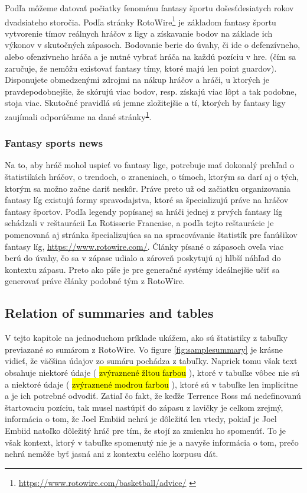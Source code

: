 Podľa \citep{Tozzi1999} môžeme datovať počiatky fenoménu fantasy športu do\linebreak[4]šesťdesiatych rokov dvadsiateho storočia. Podľa stránky RotoWire\footnote{\url{https://www.rotowire.com/basketball/advice/} \label{footnote_2_fs}} je základom fantasy športu vytvorenie tímov reálnych hráčov z ligy a získavanie bodov na základe ich výkonov v skutočných zápasoch. Bodovanie berie do úvahy, či ide o defenzívneho, alebo ofenzívneho hráča a je nutné vybrať hráča na každú pozíciu v hre. (čím sa zaručuje, že nemôžu existovať fantasy tímy, ktoré majú len point guardov). Disponujete obmedzenými zdrojmi na nákup hráčov a hráči, u ktorých je pravdepodobnejšie, že skórujú viac bodov, resp. získajú viac lôpt a tak podobne, stoja viac. Skutočné pravidlá sú jemne zložitejšie a tí, ktorých by fantasy ligy zaujímali odporúčame na dané stránky\textsuperscript{\ref{footnote_2_fs}}.

\subsubsection{Fantasy sports news}

Na to, aby hráč mohol uspieť vo fantasy lige, potrebuje mať dokonalý prehľad o štatistikách hráčov, o trendoch, o zraneniach, o tímoch, ktorým sa darí aj o tých, ktorým sa možno začne dariť neskôr. Práve preto už od začiatku organizovania fantasy líg existujú formy spravodajstva, ktoré sa špecializujú práve na hráčov fantasy športov. Podľa legendy popísanej \citep{Tozzi1999} sa hráči jednej z prvých fantasy líg schádzali v reštaurácii La Rotisserie Francaise, a podľa tejto reštaurácie je pomenovaná aj stránka špecializujúca sa na spracovávanie štatistík pre fanúšikov fantasy líg, \url{https://www.rotowire.com/}. Články písané o zápasoch oveľa viac berú do úvahy, čo sa v zápase udialo a zároveň poskytujú aj hlbší náhľad do kontextu zápasu. Preto ako píše \citep{wiseman2017} je pre generačné systémy ideálnejšie učiť sa generovať práve články podobné tým z RotoWire. 

\subsection{Relation of summaries and tables}

V tejto kapitole na jednoduchom príklade ukážem, ako sú štatistiky z tabuľky previazané so sumárom z RotoWire. Vo figure \ref{fig:samplesummary} je krásne vidieť, že väčšina údajov zo sumáru pochádza z tabuľky. Napriek tomu však text obsahuje niektoré údaje (  \hl{zvýraznené žltou farbou} ), ktoré v tabuľke vôbec nie sú a niektoré údaje ( \hl{zvýraznené modrou farbou} ), ktoré sú v tabuľke len implicitne a je ich potrebné odvodiť. Zatiaľ čo fakt, že keďže Terrence Ross má nedefinovanú štartovaciu pozíciu, tak musel nastúpiť do zápasu z lavičky je celkom zrejmý, informácia o tom, že Joel Embiid nehrá je dôležitá len vtedy, pokiaľ je Joel Embiid natoľko dôležitý hráč pre tím, že stojí za zmienku ho spomenúť. To je však kontext, ktorý v tabuľke spomenutý nie je a navyše informácia o tom, prečo nehrá nemôže byť jasná ani z kontextu celého korpusu dát.


